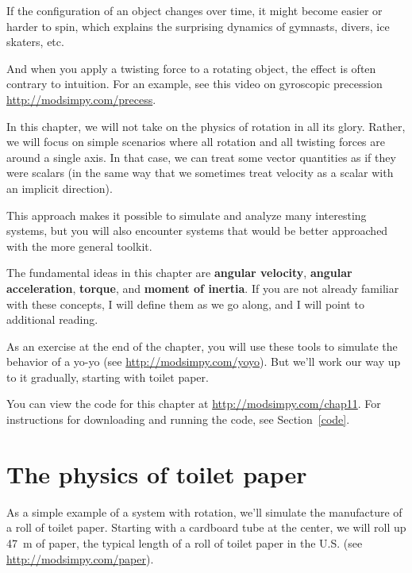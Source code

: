 \documentclass[12pt]{book}
\theoremstyle{exercise}
\begin{document}
If the configuration of an object changes over time, it might become easier or harder to spin, which explains the surprising dynamics of gymnasts, divers, ice skaters, etc.

And when you apply a twisting force to a rotating object, the effect is often contrary to intuition.  For an example, see this video on gyroscopic precession \url{http://modsimpy.com/precess}.

In this chapter, we will not take on the physics of rotation in all its glory.  Rather, we will focus on simple scenarios where all rotation and all twisting forces are around a single axis.  In that case, we can treat some vector quantities as if they were scalars (in the same way that we sometimes treat velocity as a scalar with an implicit direction).

This approach makes it possible to simulate and analyze many interesting systems, but you will also encounter systems that would be better approached with the more general toolkit.

The fundamental ideas in this chapter are {\bf angular velocity}, {\bf angular acceleration}, {\bf torque}, and {\bf moment of inertia}.  If you are not already familiar with these concepts, I will define them as we go along, and I will point to additional reading.

As an exercise at the end of the chapter, you will use these tools to simulate the behavior of a yo-yo (see \url{http://modsimpy.com/yoyo}).  But we'll work our way up to it gradually, starting with toilet paper.

You can view the code for this chapter at \url{http://modsimpy.com/chap11}.  For instructions for downloading and running the code, see Section~\ref{code}.


\section{The physics of toilet paper}
\label{paper}

As a simple example of a system with rotation, we'll simulate the manufacture of a roll of toilet paper.  Starting with a cardboard tube at the center, we will roll up \SI{47}{\meter} of paper, the typical length of a roll of toilet paper in the U.S. (see \url{http://modsimpy.com/paper}).
\end{document}
